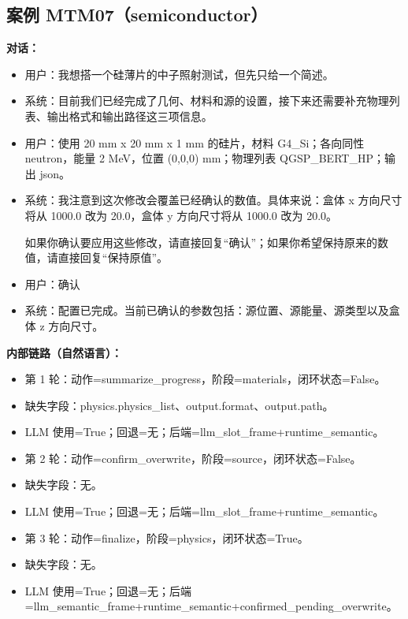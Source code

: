 \documentclass[11pt]{ctexart}
\begin{document}
\subsection{案例 MTM07（semiconductor）}
\textbf{对话：}
\begin{itemize}
\item 用户：我想搭一个硅薄片的中子照射测试，但先只给一个简述。
\item 系统：目前我们已经完成了几何、材料和源的设置，接下来还需要补充物理列表、输出格式和输出路径这三项信息。
\item 用户：使用 20 mm x 20 mm x 1 mm 的硅片，材料 G4\_Si；各向同性 neutron，能量 2 MeV，位置 (0,0,0) mm；物理列表 QGSP\_BERT\_HP；输出 json。
\item 系统：我注意到这次修改会覆盖已经确认的数值。具体来说：盒体 x 方向尺寸将从 1000.0 改为 20.0，盒体 y 方向尺寸将从 1000.0 改为 20.0。

如果你确认要应用这些修改，请直接回复“确认”；如果你希望保持原来的数值，请直接回复“保持原值”。
\item 用户：确认
\item 系统：配置已完成。当前已确认的参数包括：源位置、源能量、源类型以及盒体 z 方向尺寸。
\end{itemize}
\textbf{内部链路（自然语言）：}
\begin{itemize}
\item 第 1 轮：动作=summarize\_progress，阶段=materials，闭环状态=False。
\item 缺失字段：physics.physics\_list、output.format、output.path。
\item LLM 使用=True；回退=无；后端=llm\_slot\_frame+runtime\_semantic。
\item 第 2 轮：动作=confirm\_overwrite，阶段=source，闭环状态=False。
\item 缺失字段：无。
\item LLM 使用=True；回退=无；后端=llm\_slot\_frame+runtime\_semantic。
\item 第 3 轮：动作=finalize，阶段=physics，闭环状态=True。
\item 缺失字段：无。
\item LLM 使用=True；回退=无；后端=llm\_semantic\_frame+runtime\_semantic+confirmed\_pending\_overwrite。
\end{itemize}
\end{document}
